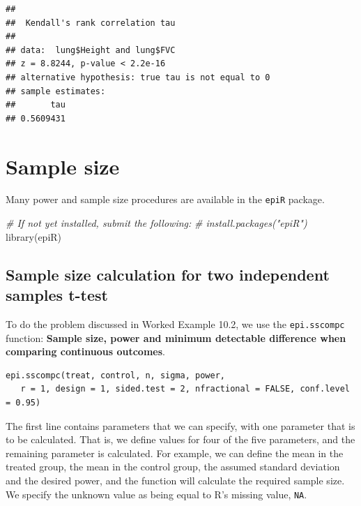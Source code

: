 \documentclass[
]{memoir}
\newenvironment{Shaded}{\begin{snugshade}}{\end{snugshade}}
\newcommand{\AttributeTok}[1]{\textcolor[rgb]{0.77,0.63,0.00}{#1}}
\newcommand{\CommentTok}[1]{\textcolor[rgb]{0.56,0.35,0.01}{\textit{#1}}}
\newcommand{\FunctionTok}[1]{\textcolor[rgb]{0.00,0.00,0.00}{#1}}
\newcommand{\NormalTok}[1]{#1}
\newcommand{\SpecialCharTok}[1]{\textcolor[rgb]{0.00,0.00,0.00}{#1}}
\newcommand{\StringTok}[1]{\textcolor[rgb]{0.31,0.60,0.02}{#1}}
\begin{document}
\begin{Shaded}
\end{Shaded}

\begin{verbatim}
## 
##  Kendall's rank correlation tau
## 
## data:  lung$Height and lung$FVC
## z = 8.8244, p-value < 2.2e-16
## alternative hypothesis: true tau is not equal to 0
## sample estimates:
##       tau 
## 0.5609431
\end{verbatim}

\hypertarget{sample-size}{%
\chapter{Sample size}\label{sample-size}}

Many power and sample size procedures are available in the \texttt{epiR} package.

\begin{Shaded}
\begin{Highlighting}[]
\CommentTok{\# If not yet installed, submit the following:}
\CommentTok{\# install.packages("epiR")}
\FunctionTok{library}\NormalTok{(epiR)}
\end{Highlighting}
\end{Shaded}

\hypertarget{sample-size-calculation-for-two-independent-samples-t-test}{%
\section{Sample size calculation for two independent samples t-test}\label{sample-size-calculation-for-two-independent-samples-t-test}}

To do the problem discussed in Worked Example 10.2, we use the \texttt{epi.sscompc} function: \textbf{Sample size, power and minimum detectable difference when comparing continuous outcomes}.

\begin{verbatim}
epi.sscompc(treat, control, n, sigma, power, 
   r = 1, design = 1, sided.test = 2, nfractional = FALSE, conf.level = 0.95)
\end{verbatim}

The first line contains parameters that we can specify, with one parameter that is to be calculated. That is, we define values for four of the five parameters, and the remaining parameter is calculated. For example, we can define the mean in the treated group, the mean in the control group, the assumed standard deviation and the desired power, and the function will calculate the required sample size. We specify the unknown value as being equal to R's missing value, \texttt{NA}.
\end{document}
